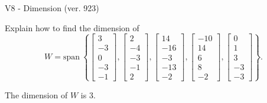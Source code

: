 \begin{exercise}
  \begin{exerciseTitle}V8 - Dimension (ver. 923)\end{exerciseTitle}
  \begin{exerciseStatement}
    Explain how to find the dimension of 
\[W=\mathrm{span}\ \left\{\left[\begin{array}{r}
3 \\
-3 \\
0 \\
-3 \\
-1
\end{array}\right] , \left[\begin{array}{r}
2 \\
-4 \\
-3 \\
-1 \\
2
\end{array}\right] , \left[\begin{array}{r}
14 \\
-16 \\
-3 \\
-13 \\
-2
\end{array}\right] , \left[\begin{array}{r}
-10 \\
14 \\
6 \\
8 \\
-2
\end{array}\right] , \left[\begin{array}{r}
0 \\
1 \\
3 \\
-3 \\
-3
\end{array}\right]\right\}.\]



  \end{exerciseStatement}
  \begin{exerciseAnswer}
   The dimension of \(W\) is  \(3\).
  


  \end{exerciseAnswer}
\end{exercise}